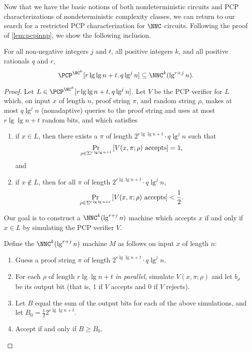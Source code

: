 \documentclass{article}
\begin{document}
Now that we have the basic notions of both nondeterministic circuits and PCP characterizations of nondeterministic complexity classes, we can return to our search for a restricted PCP characterization for $\NNC$ circuits.
Following the proof of \autoref{lem:pcpinnp}, we show the following inclusion.
\begin{proposition}\label{prop:pcpinnnc}
  For all non-negative integers $j$ and $t$, all positive integers $k$, and all positive rationals $q$ and $r$,
  \begin{equation*}
    \PCP^{\NC^k}[r \lg \lg n + t, q \lg^j n] \subseteq \NNC^k(\lg^{r + j} n).
  \end{equation*}
\end{proposition}
\begin{proof}
  Let $L \in \PCP^{\NC^k}[r \lg \lg n + t, q \lg^j n]$.
  Let $V$ be the PCP verifier for $L$ which, on input $x$ of length $n$, proof string $\pi$, and random string $\rho$, makes at most $q \lg^j n$ (nonadaptive) queries to the proof string and uses at most $r \lg \lg n + t$ random bits, and which satisfies
  \begin{enumerate}
  \item if $x \in L$, then there exists a $\pi$ of length $2^{r \lg \lg n + t} \cdot q \lg^j n$ such that
    \begin{equation*}
      \Pr_{\rho \in \Sigma^{r \lg \lg n + t}}{\left[V(x, \pi; \rho) \textnormal{ accepts}\right]} = 1,
    \end{equation*}
    and
  \item if $x \notin L$, then for all $\pi$ of length $2^{r \lg \lg n + t} \cdot q \lg^j n$,
    \begin{equation*}
      \Pr_{\rho \in \Sigma^{r \lg \lg n + t}}{\left[V(x, \pi; \rho) \textnormal{ accepts}\right]} < \frac{1}{2}.
    \end{equation*}
  \end{enumerate}
  Our goal is to construct a $\NNC^k(\lg^{r + j} n)$ machine which accepts $x$ if and only if $x \in L$ by simulating the PCP verifier $V$.

  Define the $\NNC^k(\lg^{r + j} n)$ machine $M$ as follows on input $x$ of length $n$:
  \begin{enumerate}
  \item Guess a proof string $\pi$ of length $2^{r \lg \lg n + t} \cdot q \lg^j n$.
  \item For each $\rho$ of length $r \lg \lg n + t$ \emph{in parallel}, simulate $V(x, \pi; \rho)$ and let $b_\rho$ be its output bit (that is, 1 if $V$ accepts and 0 if $V$ rejects).
  \item Let $B$ equal the sum of the output bits for each of the above simulations, and let $B_0 = \frac{1}{2} 2^{r \lg \lg n + t}$.
  \item Accept if and only if $B \geq B_0$.
  \end{enumerate}


\end{proof}
\end{document}
